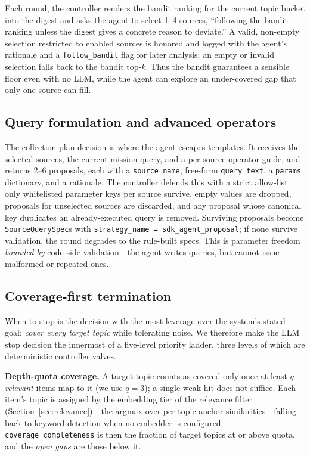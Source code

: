 \documentclass[conference]{IEEEtran}
\newcommand{\code}[1]{\texttt{\small #1}}
\begin{document}
Each round, the controller renders the bandit ranking for the current topic bucket into the digest and asks the agent to select 1--4 sources, ``following the bandit ranking unless the digest gives a concrete reason to deviate.'' A valid, non-empty selection restricted to enabled sources is honored and logged with the agent's rationale and a \code{follow\_bandit} flag for later analysis; an empty or invalid selection falls back to the bandit top-$k$. Thus the bandit guarantees a sensible floor even with no LLM, while the agent can explore an under-covered gap that only one source can fill.

\subsection{Query formulation and advanced operators}

The collection-plan decision is where the agent escapes templates. It receives the selected sources, the current mission query, and a per-source operator guide, and returns 2--6 proposals, each with a \code{source\_name}, free-form \code{query\_text}, a \code{params} dictionary, and a rationale. The controller defends this with a strict allow-list: only whitelisted parameter keys per source survive, empty values are dropped, proposals for unselected sources are discarded, and any proposal whose canonical key duplicates an already-executed query is removed. Surviving proposals become \code{SourceQuerySpec}s with \code{strategy\_name = sdk\_agent\_proposal}; if none survive validation, the round degrades to the rule-built specs. This is parameter freedom \emph{bounded by} code-side validation---the agent writes queries, but cannot issue malformed or repeated ones.

\subsection{Coverage-first termination}
\label{sec:termination}

When to stop is the decision with the most leverage over the system's stated goal: \emph{cover every target topic} while tolerating noise. We therefore make the LLM stop decision the innermost of a five-level priority ladder, three levels of which are deterministic controller valves.

\textbf{Depth-quota coverage.} A target topic counts as covered only once at least $q$ \emph{relevant} items map to it (we use $q=3$); a single weak hit does not suffice. Each item's topic is assigned by the embedding tier of the relevance filter (Section~\ref{sec:relevance})---the argmax over per-topic anchor similarities---falling back to keyword detection when no embedder is configured. \code{coverage\_completeness} is then the fraction of target topics at or above quota, and the \emph{open gaps} are those below it.
\end{document}
